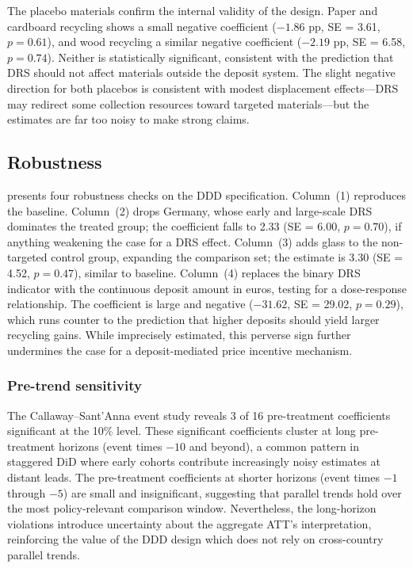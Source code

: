 \documentclass[12pt]{article}
\begin{document}
The placebo materials confirm the internal validity of the design. Paper and cardboard recycling shows a small negative coefficient ($-1.86$ pp, SE = 3.61, $p = 0.61$), and wood recycling a similar negative coefficient ($-2.19$ pp, SE = 6.58, $p = 0.74$). Neither is statistically significant, consistent with the prediction that DRS should not affect materials outside the deposit system. The slight negative direction for both placebos is consistent with modest displacement effects---DRS may redirect some collection resources toward targeted materials---but the estimates are far too noisy to make strong claims.

\begin{table}[H]

\end{table}

\subsection{Robustness}

 presents four robustness checks on the DDD specification. Column~(1) reproduces the baseline. Column~(2) drops Germany, whose early and large-scale DRS dominates the treated group; the coefficient falls to 2.33 (SE = 6.00, $p = 0.70$), if anything weakening the case for a DRS effect. Column~(3) adds glass to the non-targeted control group, expanding the comparison set; the estimate is 3.30 (SE = 4.52, $p = 0.47$), similar to baseline. Column~(4) replaces the binary DRS indicator with the continuous deposit amount in euros, testing for a dose-response relationship. The coefficient is large and negative ($-31.62$, SE = 29.02, $p = 0.29$), which runs counter to the prediction that higher deposits should yield larger recycling gains. While imprecisely estimated, this perverse sign further undermines the case for a deposit-mediated price incentive mechanism.

\begin{table}[H]

\end{table}

\subsubsection*{Pre-trend sensitivity} The Callaway--Sant'Anna event study reveals 3 of 16 pre-treatment coefficients significant at the 10\% level. These significant coefficients cluster at long pre-treatment horizons (event times $-10$ and beyond), a common pattern in staggered DiD where early cohorts contribute increasingly noisy estimates at distant leads. The pre-treatment coefficients at shorter horizons (event times $-1$ through $-5$) are small and insignificant, suggesting that parallel trends hold over the most policy-relevant comparison window. Nevertheless, the long-horizon violations introduce uncertainty about the aggregate ATT's interpretation, reinforcing the value of the DDD design which does not rely on cross-country parallel trends.
\end{document}
